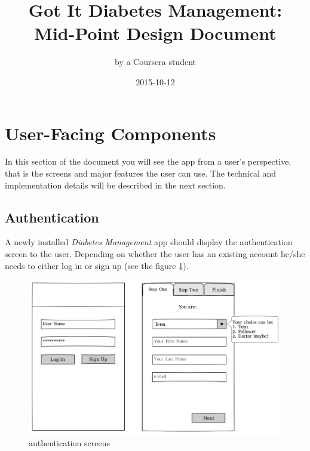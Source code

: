 \documentclass{article}
\title{Got It Diabetes Management:\\Mid-Point Design Document}
\date{2015-10-12}
\author{by a Coursera student}
\begin{document}
    \maketitle
    \newpage

\section{User-Facing Components}

    In this section of the document you will see the app from a user's perspective, that is the screens and major features the user can use. The technical and implementation details will be described in the next section.

\newpage

    \subsection{Authentication}

    A newly installed \emph{Diabetes Management} app should display the authentication screen to the user. Depending on whether the user has an existing account he/she needs to either log in or sign up (see the figure \ref{fig:screen_auth}).

    \begin{figure}[h]
        \centering
        \includegraphics[width=\textwidth,height=\textheight,keepaspectratio]{auth.png}
        \caption{authentication screens}
        \label{fig:screen_auth}
    \end{figure}
\end{document}
